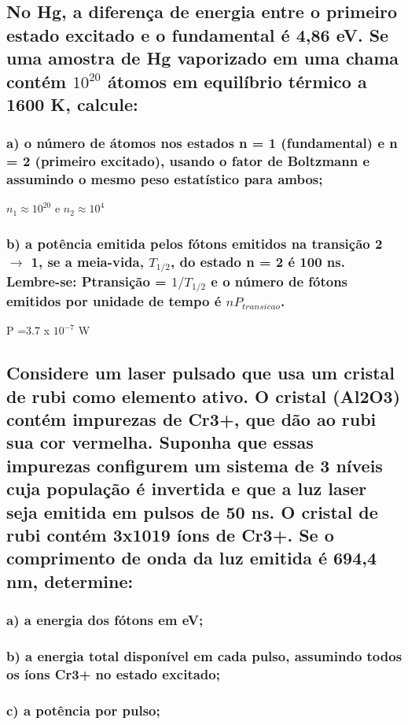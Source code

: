 \documentclass{article}
\begin{document}
\subsection{No Hg, a diferença de energia entre o primeiro estado excitado e o fundamental é 4,86 eV. Se uma amostra de Hg vaporizado em uma chama contém $10^{20}$ átomos em equilíbrio térmico a 1600 K, calcule:}

\subsubsection{a) o número de átomos nos estados n = 1 (fundamental) e n = 2 (primeiro excitado), usando o fator de Boltzmann e assumindo o mesmo peso estatístico para ambos;}

$n_1 \approx 10^{20}$
e $n_2 \approx 10^{4}$
\subsubsection{ b) a potência emitida pelos fótons emitidos na transição 2 $\to$ 1, se a meia-vida, $T_{1/2}$, do estado n = 2 é 100 ns. Lembre-se: Ptransição = $1/T_{1/2}$ e o número de fótons emitidos por unidade de tempo é $nP_{transicao}$.}

P =3.7 x $10^{-7}$ W


\subsection{Considere um laser pulsado que usa um cristal de rubi como elemento ativo. O cristal (Al2O3) contém impurezas de Cr3+, que dão ao rubi sua cor vermelha. Suponha que essas impurezas configurem um sistema de 3 níveis cuja população é invertida e que a luz laser seja emitida em pulsos de 50 ns. O cristal de rubi contém 3x1019 íons de Cr3+. Se o comprimento de onda da luz emitida é 694,4 nm, determine:}
\subsubsection{a) a energia dos fótons em eV;}

\subsubsection{b) a energia total disponível em cada pulso, assumindo todos os íons Cr3+ no estado excitado;}

\subsubsection{c) a potência por pulso; }
\end{document}
